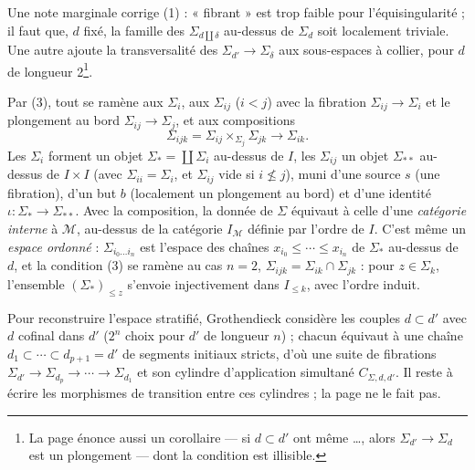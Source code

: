 \documentclass[11pt,a4paper]{article}
\begin{document}

Une note marginale corrige (1) : « fibrant » est trop faible pour
l'équisingularité ; il faut que, $d$ fixé, la famille des $\Sigma_{d \amalg \delta}$
au-dessus de $\Sigma_d$ soit localement triviale. Une autre ajoute la transversalité
des $\Sigma_{d'} \to \Sigma_\delta$ aux sous-espaces à collier, pour $d$ de longueur
2\footnote{La page énonce aussi un corollaire — si $d \subset d'$ ont même …,
alors $\Sigma_{d'} \to \Sigma_d$ est un plongement — dont la condition est
illisible.}.

Par (3), tout se ramène aux $\Sigma_i$, aux $\Sigma_{ij}$ ($i<j$) avec la fibration
$\Sigma_{ij} \to \Sigma_i$ et le plongement au bord $\Sigma_{ij} \to \Sigma_j$, et
aux compositions
\[
\Sigma_{ijk} = \Sigma_{ij} \times_{\Sigma_j} \Sigma_{jk} \longrightarrow \Sigma_{ik}.
\]
Les $\Sigma_i$ forment un objet $\Sigma_* = \coprod \Sigma_i$ au-dessus de $I$, les
$\Sigma_{ij}$ un objet $\Sigma_{**}$ au-dessus de $I \times I$ (avec $\Sigma_{ii} =
\Sigma_i$, et $\Sigma_{ij}$ vide si $i \not\leq j$), muni d'une source $s$ (une
fibration), d'un but $b$ (localement un plongement au bord) et d'une identité $\iota
: \Sigma_* \to \Sigma_{**}$. Avec la composition, la donnée de $\Sigma$ équivaut à
celle d'une \emph{catégorie interne} à $\mathcal{M}$, au-dessus de la catégorie
$I_{\mathcal{M}}$ définie par l'ordre de $I$. C'est même un \emph{espace ordonné} :
$\Sigma_{i_0 … i_n}$ est l'espace des chaînes $x_{i_0} \leq \cdots \leq
x_{i_n}$ de $\Sigma_*$ au-dessus de $d$, et la condition (3) se ramène au cas $n
= 2$, $\Sigma_{ijk} = \Sigma_{ik} \cap \Sigma_{jk}$ : pour $z \in \Sigma_k$,
l'ensemble $(\Sigma_*)_{\leq z}$ s'envoie injectivement dans $I_{\leq k}$, avec
l'ordre induit.

Pour reconstruire l'espace stratifié, Grothendieck considère les couples $d
\subset d'$ avec $d$ cofinal dans $d'$ ($2^n$ choix pour $d'$ de longueur $n$) ;
chacun équivaut à une chaîne $d_1 \subset \cdots \subset d_{p+1} = d'$ de segments
initiaux stricts, d'où une suite de fibrations $\Sigma_{d'} \to \Sigma_{d_p} \to
\cdots \to \Sigma_{d_1}$ et son cylindre d'application simultané $C_{\Sigma, d, d'}$.
Il reste à écrire les morphismes de transition entre ces cylindres ; la page ne
le fait pas.

\end{document}
